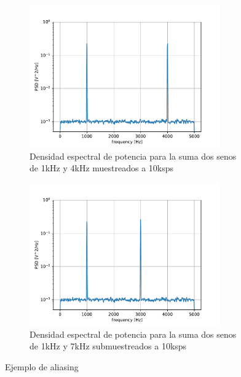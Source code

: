 \begin{figure}[t!]
	\centering
	\begin{subfigure}[t]{0.5\textwidth}
		\centering
		\includegraphics[width=0.9\textwidth]{figures/pwelch_1k_4k_10k}
		\caption{Densidad espectral de potencia para la suma dos senos de 1kHz y 4kHz muestreados a 10ksps}
	\end{subfigure}%
	\hspace*{10pt}
	\begin{subfigure}[t]{0.5\textwidth}
		\centering
		\includegraphics[width=0.9\textwidth]{figures/pwelch_1k_7k_10k}
		\caption{Densidad espectral de potencia para la suma dos senos de 1kHz y 7kHz submuestreados a 10ksps}
	\end{subfigure}
	\caption{Ejemplo de aliasing}
	\label{fig: aliasing}
\end{figure}

